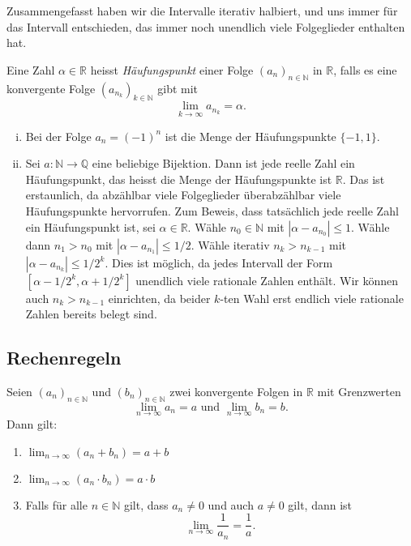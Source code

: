 \documentclass[../main.tex]{subfiles}
\begin{document}
Zusammengefasst haben wir die Intervalle
iterativ halbiert, und uns immer für das Intervall
entschieden, das immer noch unendlich viele
Folgeglieder enthalten hat.

\begin{definition}
  Eine Zahl $\alpha \in \mathbb{R}$ heisst
  \emph{Häufungspunkt} einer Folge
  ${(a_{n})}_{n \in \mathbb{N}}$ in $\mathbb{R}$,
  falls es eine konvergente Folge
  ${(a_{n_k})}_{k \in \mathbb{N}}$ gibt
  mit
  \[
    \lim_{k \to \infty} a_{n_k} = \alpha.
  \]
\end{definition}

\begin{example}
  \leavevmode
  \begin{enumerate}[(i)]
    \item Bei der Folge $a_n = (-1)^n$ ist die Menge
      der Häufungspunkte $\{-1, 1\}$.
    \item Sei $a \colon \mathbb{N} \to \mathbb{Q}$ eine
      beliebige
      Bijektion. Dann ist jede reelle Zahl ein Häufungspunkt,
      das heisst die Menge der Häufungspunkte
      ist $\mathbb{R}$. Das ist erstaunlich, da abzählbar
      viele Folgeglieder überabzählbar viele
      Häufungspunkte hervorrufen. Zum Beweis,
      dass tatsächlich jede reelle Zahl ein Häufungspunkt
      ist, sei $\alpha \in \mathbb{R}$. Wähle
      $n_0 \in \mathbb{N}$ mit $|\alpha - a_{n_0}| \leq 1$.
      Wähle dann $n_{1} > n_0$ mit $|\alpha - a_{n_1}| \leq 1/2$.
      Wähle iterativ $n_{k} > n_{k-1}$ mit $|\alpha - a_{n_k}|
      \leq 1/2^k$. Dies ist möglich, da jedes Intervall der
      Form
      $[\alpha - 1/2^k, \alpha + 1/2^k]$ unendlich viele
      rationale Zahlen enthält. Wir können auch $n_k > n_{k-1}$
      einrichten, da beider $k$-ten Wahl erst endlich viele
      rationale Zahlen bereits belegt sind.
  \end{enumerate}
\end{example}


\subsection*{Rechenregeln}
\begin{proposition}
  Seien ${(a_n)}_{n \in \mathbb{N}}$ und
  ${(b_n)}_{n \in \mathbb{N}}$ zwei
  konvergente Folgen in $\mathbb{R}$ mit Grenzwerten
  \[
    \lim_{n \to \infty} a_n = a \text{ und }
    \lim_{n \to \infty} b_n = b.
  \]
  Dann gilt:
  \begin{enumerate}[\normalfont(i)]
    \item $\lim_{n \to \infty} (a_n + b_n) = a + b$ 
    \item $\lim_{n \to \infty} (a_n \cdot b_n) = a \cdot b$
    \item Falls für alle $n \in \mathbb{N}$ gilt,
      dass $a_n \neq 0$ und auch $a \neq 0$ gilt,
      dann ist
      \[
        \lim_{n \to \infty} \frac{1}{a_n} = \frac{1}{a}.
      \]
  \end{enumerate}
\end{proposition}
\end{document}
